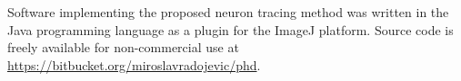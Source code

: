 Software implementing the proposed neuron tracing method was written in the Java programming language as a plugin for the ImageJ platform. Source code is freely available for non-commercial use at \url{https://bitbucket.org/miroslavradojevic/phd}.
